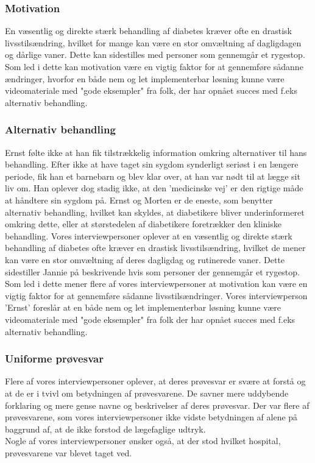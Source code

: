 \subsubsection{Motivation}
En væsentlig og direkte stærk behandling af diabetes kræver ofte en drastisk livsstilsændring, hvilket for mange kan være en stor omvæltning af dagligdagen og dårlige vaner. Dette kan sidestilles med personer som gennemgår et rygestop. Som led i dette kan motivation være en vigtig faktor for at gennemføre sådanne ændringer, hvorfor en både nem og let implementerbar løsning kunne være videomateriale med "gode eksempler" fra folk, der har opnået succes med f.eks alternativ behandling.

\subsubsection{Alternativ behandling}
Ernst følte ikke at han fik tilstrækkelig information omkring alternativer til hans behandling. Efter ikke at have taget sin sygdom synderligt seriøst i en længere periode, fik han et barnebarn og blev klar over, at han var nødt til at lægge sit liv om. Han oplever dog stadig ikke, at den 'medicinske vej' er den rigtige måde at håndtere sin sygdom på. Ernst og Morten er de eneste, som benytter alternativ behandling, hvilket kan skyldes, at diabetikere bliver underinformeret omkring dette, eller at størstedelen af diabetikere foretrækker den kliniske behandling. 
Vores interviewpersoner oplever at en væsentlig og direkte stærk behandling af diabetes ofte kræver en drastisk livsstilsændring, hvilket de mener kan være en stor omvæltning af deres dagligdag og rutinerede vaner. Dette sidestiller Jannie på beskrivende hvis som personer der gennemgår et rygestop. Som led i dette mener flere af vores interviewpersoner at motivation kan være en vigtig faktor for at gennemføre sådanne livsstilsændringer. Vores interviewperson 'Ernst' foreslår at en både nem og let implementerbar løsning kunne være videomateriale med "gode eksempler" fra folk der har opnået succes med f.eks alternativ behandling.

\subsubsection{Uniforme prøvesvar}
Flere af vores interviewpersoner oplever, at deres prøvesvar er svære at forstå og at de er i tvivl om betydningen af prøvesvarene. De savner mere uddybende forklaring og mere gense navne og beskrivelser af deres prøvesvar. 
Der var flere af prøvesvarene, som vores interviewpersoner ikke vidste betydningen af alene på baggrund af, at de ikke forstod de lægefaglige udtryk.\\
Nogle af vores interviewpersoner ønsker også, at der stod hvilket hospital, prøvesvarene var blevet taget ved.


